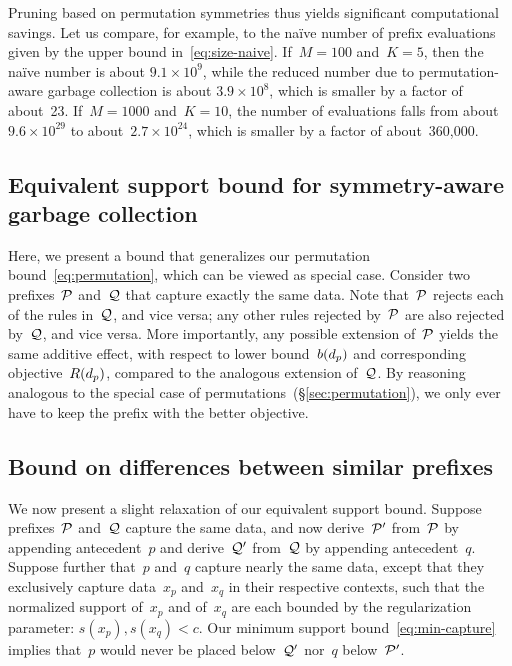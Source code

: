 Pruning based on permutation symmetries thus yields significant
computational savings.
%
Let us compare, for example, to the na\"ive number of prefix evaluations
given by the upper bound in~\eqref{eq:size-naive}.
%
If~${M = 100}$ and~${K = 5}$, then the na\"ive number is about
${9.1 \times 10^9}$, while the reduced number due to permutation-aware
garbage collection is about ${3.9 \times 10^8}$,
which is smaller by a factor of about~23.
%
If~${M=1000}$ and~${K = 10}$, the number of evaluations falls from
about~${9.6 \times 10^{29}}$ to about~${2.7 \times 10^{24}}$,
which is smaller by a factor of about~360,000.
%

\subsection{Equivalent support bound for symmetry-aware garbage collection}

Here, we present a bound that generalizes our permutation bound~\eqref{eq:permutation},
which can be viewed as special case.
%
Consider two prefixes~$\cal P$ and~$\cal Q$ that capture exactly the same data.
%
Note that~$\cal P$ rejects each of the rules in~$\cal Q$, and vice versa;
any other rules rejected by~$\cal P$ are also rejected by~$\cal Q$, and vice versa.
%
More importantly, any possible extension of~$\cal P$ yields the same additive effect,
with respect to lower bound~$b(d_p)$ and corresponding objective~$R(d_p)$,
compared to the analogous extension of~$\cal Q$.
%
By reasoning analogous to the special case of permutations~(\S\ref{sec:permutation}),
we only ever have to keep the prefix with the better objective.

\subsection{Bound on differences between similar prefixes}

We now present a slight relaxation of our equivalent support bound.
%
Suppose prefixes~$\cal P$ and~$\cal Q$ capture the same data,
and now derive~$\cal P'$ from~$\cal P$ by appending antecedent~$p$
and derive~$\cal Q'$ from~$\cal Q$ by appending antecedent~$q$.
%
Suppose further that~$p$ and~$q$ capture nearly the same data, except that
they exclusively capture data~$x_p$ and~$x_q$ in their respective contexts,
such that the normalized support of~$x_p$ and of~$x_q$ are each bounded by
the regularization parameter: ${s(x_p), s(x_q) < c}$.
%
Our minimum support bound~\eqref{eq:min-capture} implies
that~$p$ would never be placed below~$\cal Q'$ nor~$q$ below~$\cal P'$.

